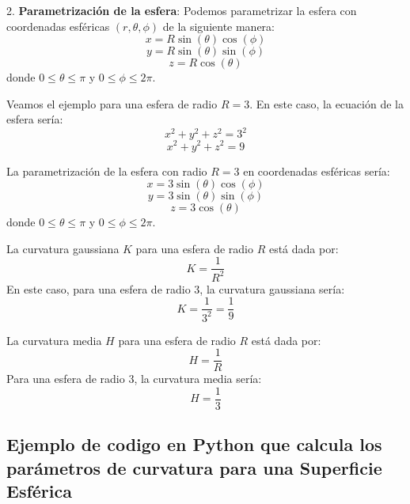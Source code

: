 \documentclass{article}
\begin{document}
	2. \textbf{Parametrización de la esfera}:
	Podemos parametrizar la esfera con coordenadas esféricas $ (r, \theta, \phi) $ de la siguiente manera:
	$$ x = R \sin(\theta) \cos(\phi) $$
	$$ y = R \sin(\theta) \sin(\phi) $$
	$$ z = R \cos(\theta) $$
	donde $ 0 \leq \theta \leq \pi $ y $ 0 \leq \phi \leq 2\pi $.
	
	Veamos el ejemplo para una esfera de radio $ R = 3 $. En este caso, la ecuación de la esfera sería:
	$$ x^2 + y^2 + z^2 = 3^2 $$
	$$ x^2 + y^2 + z^2 = 9 $$
	
	La parametrización de la esfera con radio $ R = 3 $ en coordenadas esféricas sería:
	$$ x = 3 \sin(\theta) \cos(\phi) $$
	$$ y = 3 \sin(\theta) \sin(\phi) $$
	$$ z = 3 \cos(\theta) $$
	donde $ 0 \leq \theta \leq \pi $ y $ 0 \leq \phi \leq 2\pi $.
	
	La curvatura gaussiana $ K $ para una esfera de radio $ R $ está dada por:
	$$ K = \frac{1}{R^2} $$
	En este caso, para una esfera de radio 3, la curvatura gaussiana sería:
	$$ K = \frac{1}{3^2} = \frac{1}{9} $$
	
	La curvatura media $ H $ para una esfera de radio $ R $ está dada por:
	$$ H = \frac{1}{R} $$
	Para una esfera de radio 3, la curvatura media sería:
	$$ H = \frac{1}{3}  $$
	
\subsection{Ejemplo de codigo en Python que calcula los parámetros de curvatura para una Superficie Esférica}
\end{document}
